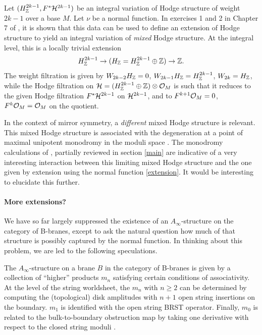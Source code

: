 Let $(H_{\mathbb Z}^{2k-1},F^*{\cal H}^{2k-1})$ be an integral variation of Hodge
structure of weight $2k-1$ over a base $M$. Let $\nu$ be a normal
function. In exercises 1 and 2 in Chapter 7 of \cite{voisinbook2}, 
it is shown that this data can be used to define an extension of Hodge
structure to yield an integral variation of {\it mixed} Hodge
structure. At the integral level, this is a locally trivial extension
\begin{equation}
\eqlabel{extension}
H_\zet^{2k-1} \to (H_\zet= H_\zet^{2k-1}\oplus\zet) \to \zet .
\end{equation}
The weight filtration is given by $W_{2k-2}H_{\mathbb Z}=0$, 
$W_{2k-1}H_{\mathbb Z}=H_{\mathbb Z}^{2k-1}$, $W_{2k}=H_{\mathbb Z}$, while
the Hodge filtration on ${\cal H}=(H_{\mathbb Z}^{2k-1}\oplus{\mathbb Z})\otimes
{\cal O}_M$ is such that it reduces to the given Hodge filtration  
$F^*{\cal H}^{2k-1}$ on ${\cal H}^{2k-1}$, and to $F^{k+1}{\cal O}_M=0$, 
$F^k{\cal O}_M={\cal O}_M$ on the quotient.

In the context of mirror symmetry, a {\it different} mixed Hodge structure
is relevant. This mixed Hodge structure is associated with the degeneration 
at a point of maximal unipotent monodromy in the moduli space 
\cite{guide,delignelimit}. The monodromy calculations of \cite{open}, 
partially reviewed in section \ref{main} are indicative of a very interesting 
interaction between this limiting mixed Hodge structure and the one given 
by extension using the normal function \eqref{extension}. It would be 
interesting to elucidate this further.


\paragraph{More extensions?}

We have so far largely suppressed the existence of an $A_\infty$-structure
on the category of B-branes, except to ask the natural question how much
of that structure is possibly captured by the normal function. 
In thinking about this problem, we are led to the following speculations.

The $A_\infty$-structure on a brane $B$ in the category of B-branes is
given by a collection of ``higher'' products $m_n$ satisfying certain
conditions of associativity. At the level of the string worldsheet,
the $m_n$ with $n\ge 2$ can be determined by computing the (topological) 
disk amplitudes with $n+1$ open string insertions on the boundary. $m_1$
is identified with the open string BRST operator. Finally, $m_0$ is related
to the bulk-to-boundary obstruction map by taking one derivative with
respect to the closed string moduli \cite{extended}.

